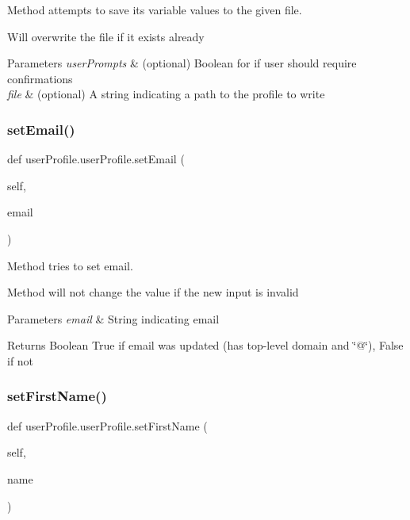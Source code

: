 Method attempts to save its variable values to the given file. 

Will overwrite the file if it exists already 
\begin{DoxyParams}{Parameters}
{\em user\+Prompts} & (optional) Boolean for if user should require confirmations \\
\hline
{\em file} & (optional) A string indicating a path to the profile to write \\
\hline
\end{DoxyParams}
\mbox{\label{classuserProfile_1_1userProfile_a6420f8a55919d59d5d357b9ed93cb279}} 
\subsubsection{\texorpdfstring{set\+Email()}{setEmail()}}
{\footnotesize\ttfamily def user\+Profile.\+user\+Profile.\+set\+Email (\begin{DoxyParamCaption}\item[{}]{self,  }\item[{}]{email }\end{DoxyParamCaption})}



Method tries to set email. 

Method will not change the value if the new input is invalid 
\begin{DoxyParams}{Parameters}
{\em email} & String indicating email \\
\hline
\end{DoxyParams}
\begin{DoxyReturn}{Returns}
Boolean True if email was updated (has top-\/level domain and \char`\"{}@\char`\"{}), False if not 
\end{DoxyReturn}
\mbox{\label{classuserProfile_1_1userProfile_aafd4f084d296a83fb1ac2ff703aaa251}} 
\subsubsection{\texorpdfstring{set\+First\+Name()}{setFirstName()}}
{\footnotesize\ttfamily def user\+Profile.\+user\+Profile.\+set\+First\+Name (\begin{DoxyParamCaption}\item[{}]{self,  }\item[{}]{name }\end{DoxyParamCaption})}



